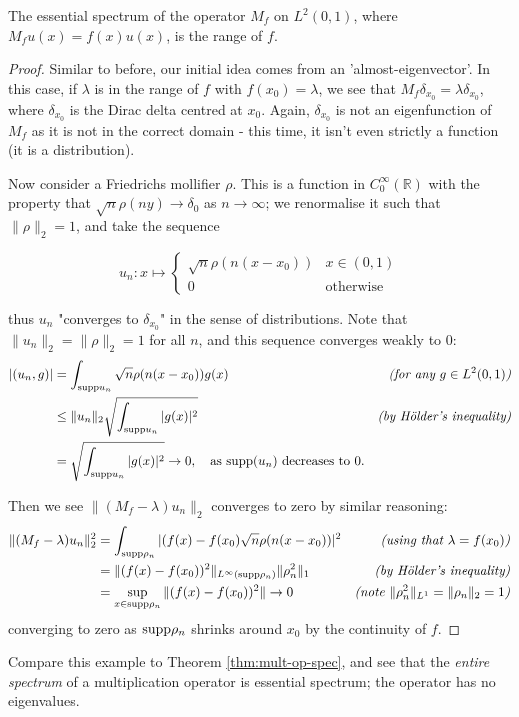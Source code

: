 \documentclass[../main.tex]{subfiles}
\begin{document}
\begin{proposition}
The essential spectrum of the operator $M_f$ on $L^2(0, 1)$, where $M_f u(x) = f(x)u(x)$, is the range of $f$.
\end{proposition}
\begin{proof}
Similar to before, our initial idea comes from an 'almost-eigenvector'. In this case, if $\lambda$ is in the range
of $f$ with $f(x_0) = \lambda$, we see that $M_f \delta_{x_0} = \lambda \delta_{x_0}$, where $\delta_{x_0}$ is the
Dirac delta centred at $x_0$. Again, $\delta_{x_0}$ is not an eigenfunction of $M_f$ as it is not in the correct domain - this time, 
it isn't even strictly a function (it is a distribution).

Now consider a Friedrichs mollifier $\rho$. This is a function in $C^\infty_0(\mathbb{R})$ with the property that $\sqrt{n}\rho(ny) \rightarrow \delta_0$ as $n \rightarrow \infty$; we renormalise it such that $\|\rho\|_2 = 1$, and take the sequence 

$$u_n: x \mapsto 
\begin{cases}
  \sqrt{n}\rho(n(x-x_0)) & x \in (0, 1) \\
  0 & \text{otherwise}
\end{cases}
$$

thus $u_n$ "converges to $\delta_{x_0}$" in the sense of distributions. Note that $\|u_n\|_2 = \|\rho\|_2 = 1$ for all $n$, and this sequence converges weakly to 0:
\begin{align*}
|( u_n, g )| & = \int_{\mathrm{supp}{u_n}}\sqrt{n}\rho(n(x-x_0))g(x) & \text{\emph{(for any $g \in L^2(0, 1)$)}} \\
& \leq \|u_n\|_2 \sqrt{\int_{\mathrm{supp}{u_n}} |g(x)|^2} & \text{\emph{(by H\"older's inequality)}} \\
& = \sqrt{\int_{\mathrm{supp}{u_n}} |g(x)|^2} \rightarrow 0, \quad \text{as $\mathrm{supp}(u_n)$ decreases to 0.} &
\end{align*}

Then we see $\|(M_f - \lambda)u_n\|_2$ converges to zero by similar reasoning:
\begin{align*}
\|(M_f - \lambda)u_n\|^2_2 & = \int_{\mathrm{supp} \rho_n} |(f(x) - f(x_0) \sqrt{n} \rho(n(x-x_0))|^2 & \text{\emph{(using that $\lambda = f(x_0)$)}} \\
& = \|(f(x) - f(x_0))^2\|_{L^\infty (\mathrm{supp} \rho_n)} \|\rho_n^2\|_1 & \text{\emph{(by H\"older's inequality)}} \\
& = \sup_{x \in \mathrm{supp} \rho_n} \|(f(x) - f(x_0))^2\| \rightarrow 0 & \text{\emph{(note $\|\rho_n^2\|_{L^1} = \|\rho_n\|_2 = 1$)}} \\
\end{align*}
converging to zero as $\mathrm{supp} \rho_n$ shrinks around $x_0$ by the continuity of $f$.
\end{proof}
Compare this example to Theorem \ref{thm:mult-op-spec}, and see that the \emph{entire spectrum} of a multiplication operator is essential spectrum; the
operator has no eigenvalues.
\end{document}
